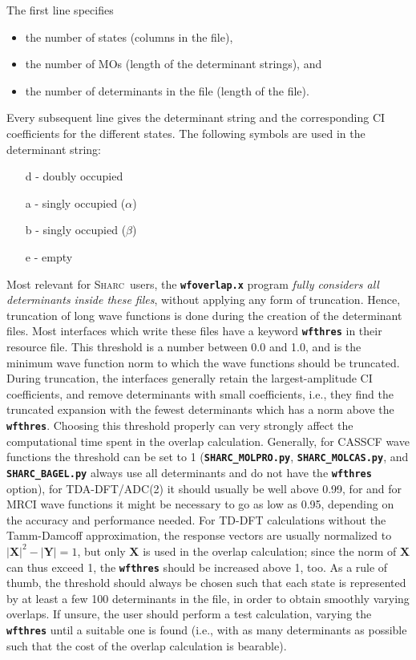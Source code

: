 \documentclass[a4paper,10pt,DIV=15,openany]{scrbook}
\newcommand{\sharc}{\textsc{Sharc}}
\newcommand{\ttt}[1]{\textbf{\texttt{#1}}}
\begin{document}
The first line specifies
%
\begin{itemize}
\item the number of states (columns in the file),
\item the number of MOs (length of the determinant strings), and
\item the number of determinants in the file (length of the file).
\end{itemize}

Every subsequent line gives the determinant string and the corresponding CI coefficients for the different states.
The following symbols are used in the determinant string:

\begin{itemize}
\item[d] - doubly occupied
\item[a] - singly occupied ($\alpha$)
\item[b] - singly occupied ($\beta$)
\item[e] - empty
\end{itemize}

Most relevant for \sharc\ users, the \ttt{wfoverlap.x} program \emph{fully considers all determinants inside these files}, without applying any form of truncation. Hence, truncation of long wave functions is done during the creation of the determinant files.
Most interfaces which write these files have a keyword \ttt{wfthres} in their resource file. This threshold is a number between 0.0 and 1.0, and is the minimum wave function norm to which the wave functions should be truncated. During truncation, the interfaces generally retain the largest-amplitude CI coefficients, and remove determinants with small coefficients, i.e., they find the truncated expansion with the fewest determinants which has a norm above the \ttt{wfthres}.
Choosing this threshold properly can very strongly affect the computational time spent in the overlap calculation. Generally, for CASSCF wave functions the threshold can be set to 1 (\ttt{SHARC\_MOLPRO.py}, \ttt{SHARC\_MOLCAS.py}, and \ttt{SHARC\_BAGEL.py} always use all determinants and do not have the \ttt{wfthres} option), for TDA-DFT/ADC(2) it should usually be well above 0.99, for and for MRCI wave functions it might be necessary to go as low as 0.95, depending on the accuracy and performance needed.
For TD-DFT calculations without the Tamm-Damcoff approximation, the response vectors are usually normalized to $|\mathbf{X}|^2-|\mathbf{Y}|=1$, but only $\mathbf{X}$ is used in the overlap calculation; since the norm of $\mathbf{X}$ can thus exceed 1, the \ttt{wfthres} should be increased above 1, too.
As a rule of thumb, the threshold should always be chosen such that each state is represented by at least a few 100 determinants in the file, in order to obtain smoothly varying overlaps.
If unsure, the user should perform a test calculation, varying the \ttt{wfthres} until a suitable one is found (i.e., with as many determinants as possible such that the cost of the overlap calculation is bearable).
\end{document}
